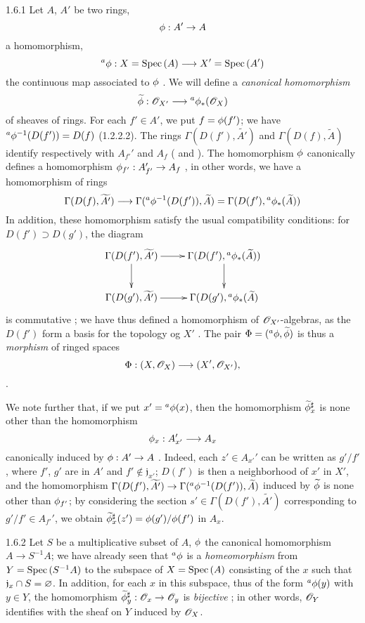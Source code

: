 \begin{env}{1.6.1}
\label{env-1.1.6.1}
Let $A$, $A'$ be two rings,
\[
  \phi:A'\to A
\]
a homomorphism,
\[
  {}^a\phi:X={\mathop{\mathrm{Spec}}\nolimits}\,(A)\longrightarrow X'={\mathop{\mathrm{Spec}}\nolimits}\,(A')
\]
the continuous map associated to $\phi$ . We will define a \emph{canonical
homomorphism}
\[
  \widetilde{\phi}:\mathscr{O}_{X'}\longrightarrow{}^a\phi_*(\mathscr{O}_X)
\]
of sheaves of rings. For each $f'\in A'$, we put $f=\phi(f')$; we have
${}^a\phi^{-1}(D(f'))=D(f)$ (1.2.2.2). The rings $\Gamma(D(f'),\widetilde{A'})$ and
$\Gamma(D(f),\widetilde{A})$ identify respectively with $A_{f'}'$ and $A_f$
( and ). The homomorphism $\phi$ canonically defines a
homomorphism $\phi_{f'}:A_{f'}'\to A_f$ , in other words, we have a
homomorphism of rings
\[
  \Gamma(D(f),\widetilde{A'})\longrightarrow\Gamma({}^a\phi^{-1}(D(f')),\widetilde{A})
  =\Gamma(D(f'),{}^a\phi_*(\widetilde{A}))
\]
In addition, these homomorphism satisfy the usual compatibility conditions: for
$D(f')\supset D(g')$, the diagram
\[
  \xymatrix{
    \Gamma(D(f'),\widetilde{A'})\ar[r]\ar[d] &
    \Gamma(D(f'),{}^a\vphi_*(\widetilde{A}))\ar[d]\\
    \Gamma(D(g'),\widetilde{A'})\ar[r] &
    \Gamma(D(g'),{}^a\vphi_*(\widetilde{A})
  }
\]
is commutative ; we have thus defined a homomorphism of $\mathscr{O}_{X'}$-algebras,
as the $D(f')$ form a basis for the topology og $X'$ . The pair
$\Phi=({}^a\phi,\widetilde{\phi})$ is thus a \emph{morphism} of ringed spaces
\[
  \Phi:(X,\mathscr{O}_X)\longrightarrow(X',\mathscr{O}_{X'}),
\]
.

We note further that, if we put $x'={}^a\phi(x)$, then the homomorphism
$\widetilde{\phi}_x^\sharp$  is none other than the homomorphism
\[
  \phi_x:A_{x'}'\longrightarrow A_x
\]
canonically induced by $\phi:A'\to A$ . Indeed, each $z'\in A_{x'}'$
can be written as $g'/f'$, where $f'$, $g'$ are in $A'$ and $f'\not\in\mathfrak{j}_{x'}$;
$D(f')$ is then a neighborhood of $x'$ in $X'$, and the homomorphism
$\Gamma(D(f'),\widetilde{A'})\to\Gamma({}^a\phi^{-1}(D(f')),\widetilde{A})$ induced by
$\widetilde{\phi}$ is none other than $\phi_{f'}$; by considering the section
$s'\in\Gamma(D(f'),\widetilde{A'})$ corresponding to $g'/f'\in A_{f'}'$, we obtain
$\widetilde{\phi}_x^\sharp(z')=\phi(g')/\phi(f')$ in $A_x$.
\end{env}

\begin{env}[Example]{1.6.2}
\label{exm-1.1.6.2}
Let $S$ be a multiplicative subset of $A$, $\phi$ the canonical homomorphism $A\to S^{-1}A$;
we have already seen  that ${}^a\phi$ is a \emph{homeomorphism} from
$Y={\mathop{\mathrm{Spec}}\nolimits}\,(S^{-1}A)$ to the subspace of $X={\mathop{\mathrm{Spec}}\nolimits}\,(A)$ consisting of the $x$ such that
$\mathfrak{j}_x\cap S=\varnothing$. In addition, for each $x$ in this subspace, thus of the form
${}^a\phi(y)$ with $y\in Y$, the homomorphism $\widetilde{\phi}_y^\sharp:\mathscr{O}_x\to\mathscr{O}_y$ is
\emph{bijective} ; in other words, $\mathscr{O}_Y$ identifies with the sheaf on $Y$
induced by $\mathscr{O}_X$.
\end{env}

